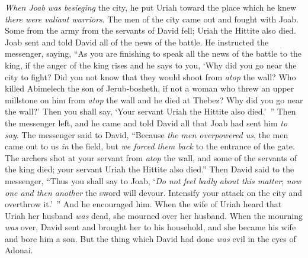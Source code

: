 \begin{biblechapter}
\verse \textit{When Joab was besieging} the city, he put Uriah toward the place which he knew \textit{there were valiant warriors}.
\verse The men of the city came out and fought with Joab. Some from the army from the servants of David fell; Uriah the Hittite also died.
\verse Joab sent and told David all of the news of the battle.
\verse He instructed the messenger, saying, “As you are finishing to speak all the news of the battle to the king,
\verse if the anger of the king rises and he says to you, ‘Why did you go near the city to fight? Did you not know that they would shoot from \textit{atop} the wall?
\verse Who killed Abimelech the son of Jerub-bosheth, if not a woman who threw an upper millstone on him from \textit{atop} the wall and he died at Thebez? Why did you go near the wall?’ Then you shall say, ‘Your servant Uriah the Hittite also died.’ ”
\verse Then the messenger left, and he came and told David all that Joab had sent him \textit{to say}.
\verse The messenger said to David, “Because \textit{the men overpowered us}, the men came out to us \textit{in} the field, but \textit{we forced them back} to the entrance of the gate.
\verse The archers shot at your servant from \textit{atop} the wall, and some of the servants of the king died; your servant Uriah the Hittite also died.”
\verse Then David said to the messenger, “Thus you shall say to Joab, ‘\textit{Do not feel badly about this matter}; \textit{now one and then another} the sword will devour. Intensify your attack on the city and overthrow it.’ ” And he encouraged him.
\verse When the wife of Uriah heard that Uriah her husband \textit{was} dead, she mourned over her husband.
\verse When the mourning \textit{was} over, David sent and brought her to his household, and she became his wife and bore him a son. But the thing which David had done \textit{was} evil in the eyes of Adonai.
\end{biblechapter}

